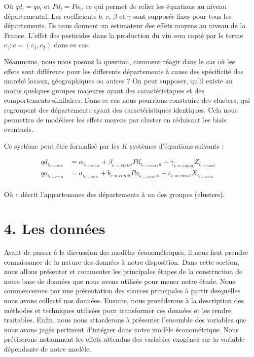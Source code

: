 \documentclass[11pt,]{article}
\begin{document}
Où \(qd_i = qo_i\) et \(Pd_i = Po_i\), ce qui permet de relier les
équations au niveau départemental. Les coefficients \(b\), \(c\),
\(\beta\) et \(\gamma\) sont supposés fixes pour tous les départements.
Ils nous donnent un estimateur des effets moyens au niveau de la France.
L'effet des pesticides dans la production du vin sera capté par le terme
\(c_{1} : c = (c_{1}, c_{2})\) dans ce cas.

Néanmoins, nous nous posons la question, comment réagir dans le cas où
les effets sont différents pour les differents départements à cause des
spécificité des marché locaux, géographiques ou autres ? On peut
supposer, qu'il existe au moins quelques groupes majeures ayant des
caractéristiques et des comportements similaires. Dans ce cas nous
pourrions construire des clusters, qui regroupent des départements ayant
des caractéristiques identiques. Cela nous permettra de modèliser les
effets moyens par cluster en réduisant les biais eventuels.

Ce système peut être formalisé par les \(K\) systèmes d'équations
suivants :

\begin{align*}
  qd_{i_{c = const}} & = \alpha_{i_{c = const}} + \beta_{c = const} Pd_{i_{c = const},d} + \gamma_{c = const} Z_{i_{c = const}} \\
  qo_{i_{c = const}} & = a_{i_{c = const}} + b_{c = const} Po_{i_{c = const},o} + c_{c = const} X_{i_{c = const}} \\ 
\end{align*}

Où \(c\) décrit l'appartenance des départements à un des groupes
(clusters).

\hypertarget{les-donnees}{%
\section{4. Les données}\label{les-donnees}}

Avant de passer à la discussion des modèles économétriques, il nous faut
prendre connaissance de la nature des données à notre disposition. Dans
cette section, nous allons présenter et commenter les principales étapes
de la construction de notre base de données que nous avons utilisée pour
mener notre étude. Nous commencerons par une présentation des sources
principales à partir desquelles nous avons collecté nos données.
Ensuite, nous procéderons à la description des méthodes et techniques
utilisées pour transformer ces données et les rendre traitables. Enfin,
nous nous attarderons à présenter l'ensemble des variables que nous
avons jugés pertinent d'intégrer dans notre modèle économétrique. Nous
préciserons notamment les effets attendus des variables exogènes sur la
variable dépendante de notre modèle.
\end{document}

